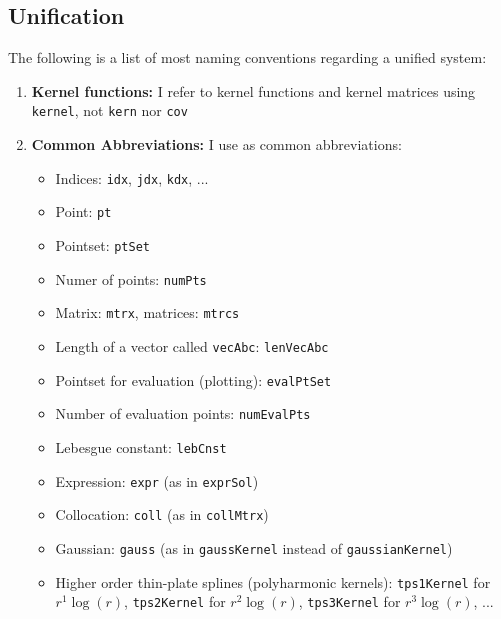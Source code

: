 \documentclass[11pt]{article}
\begin{document}
\subsection{Unification}
The following is a list of most naming conventions regarding a unified system:
\begin{enumerate}
\item \textbf{Kernel functions:} I refer to kernel functions and kernel matrices using \texttt{kernel}, not \texttt{kern} nor \texttt{cov}
\item \textbf{Common Abbreviations:} I use as common abbreviations:
\begin{itemize}
\item Indices: \texttt{idx}, \texttt{jdx}, \texttt{kdx}, ...
\item Point: \texttt{pt}
\item Pointset: \texttt{ptSet}
\item Numer of points: \texttt{numPts}
\item Matrix: \texttt{mtrx}, matrices: \texttt{mtrcs}
\item Length of a vector called \texttt{vecAbc}: \texttt{lenVecAbc}
\item Pointset for evaluation (plotting): \texttt{evalPtSet}
\item Number of evaluation points: \texttt{numEvalPts}
\item Lebesgue constant: \texttt{lebCnst}
\item Expression: \texttt{expr} (as in \texttt{exprSol}) 
\item Collocation: \texttt{coll} (as in \texttt{collMtrx}) 
\item Gaussian: \texttt{gauss} (as in \texttt{gaussKernel} instead of \texttt{gaussianKernel})
\item Higher order thin-plate splines (polyharmonic kernels): \texttt{tps1Kernel} for $r^1\log(r)$, \texttt{tps2Kernel} for $r^2\log(r)$, \texttt{tps3Kernel} for $r^3\log(r)$, ...
\end{itemize}
\end{enumerate}
\end{document}
